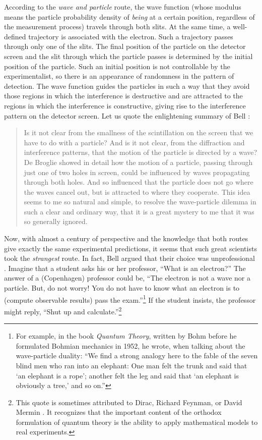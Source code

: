 \documentclass[onecolumn,nofootinbib, secnumarabic, amsmath, nobibnotes,11pt,aps,pra]{revtex4-1}
\begin{document}
According to the \textit{wave and particle} route, the wave function (whose modulus means the particle probability density of \textit{being} at a certain position, regardless of the measurement process) travels through both slits. At the same time, a well-defined trajectory is associated with the electron. Such a trajectory passes through only one of the slits. The final position of the particle on the detector screen and the slit through which the particle passes is determined by the initial position of the particle. Such an initial position is not controllable by the experimentalist, so there is an appearance of randomness in the pattern of detection. The wave function guides the particles in such a way that they avoid those regions in which the interference is destructive and are attracted to the regions in which the interference is constructive, giving rise to the interference pattern on the detector screen. Let us quote the enlightening summary of Bell \cite{om.Bell1987}:

\begin{quote}
Is it not clear from the smallness of the scintillation on the screen that we have to do with a particle? And is it not clear, from the diffraction and interference patterns, that the motion of the particle is directed by a wave? De Broglie showed in detail how the motion of a particle, passing through just one of two holes in screen, could be influenced by waves propagating through both holes. And so influenced that the particle does not go where the waves cancel out, but is attracted to where they cooperate. This idea seems to me so natural and simple, to resolve the wave-particle dilemma in such a clear and ordinary way, that it is a great mystery to me that it was so generally ignored.
\end{quote}

Now, with almost a century of perspective and the knowledge that both routes give exactly the same experimental predictions, it seems that such great scientists took the \textit{strangest} route. In fact, Bell argued that their choice was unprofessional \cite{om.Bell1987}. Imagine that a student asks his or her professor, ``What is an electron?'' The answer of a (Copenhagen) professor could be, ``The electron is not a wave nor a particle. But, do not worry! You do not have to know what an electron is to (compute observable results) pass the exam.''\footnote{For example, in the book \textit{Quantum Theory}, \cite{om.bohmbook} written by Bohm before he formulated Bohmian mechanics in 1952, he wrote, when talking about the wave-particle duality: ``We find a strong analogy here to the fable of the seven blind men who ran into an elephant: One man felt the trunk and said that `an elephant is a rope'; another felt the leg and said that `an elephant is obviously a tree,' and so on.''} If the student insists, the professor might reply, ``Shut up and calculate.''\footnote{This quote is sometimes attributed to Dirac, Richard Feynman, or David Mermin \cite{om.mermin,om.mermin2}. It recognizes that the important content of the orthodox formulation of quantum theory is the ability to apply mathematical models to real experiments.}
\end{document}
